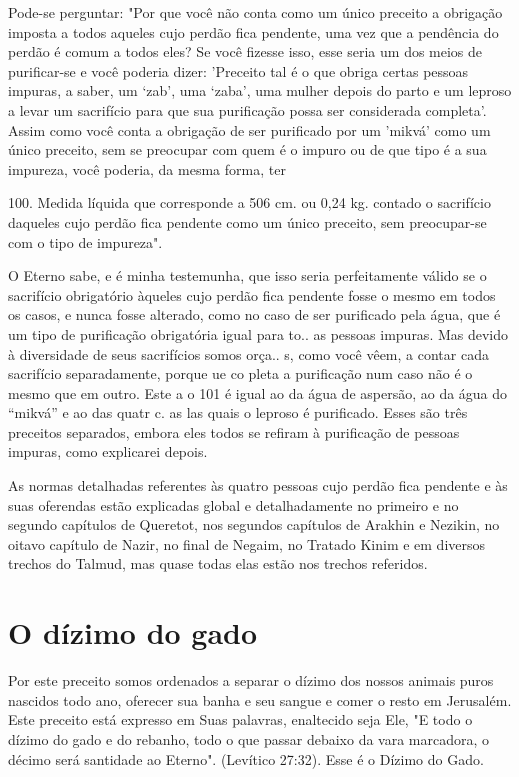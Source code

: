 Pode-se perguntar: "Por que você não conta como um único pre­ceito a
obrigação imposta a todos aqueles cujo perdão fica pendente, uma vez que
a pendência do perdão é comum a todos eles? Se você fizesse isso, esse
seria um dos meios de purificar-se e você poderia dizer: 'Preceito tal é
o que obriga certas pessoas impuras, a saber, um `zab', uma `zaba', uma
mulher de­pois do parto e um leproso a levar um sacrifício para que sua
purificação possa ser considerada completa'. Assim como você conta a
obrigação de ser purifica­do por um 'mikvá' como um único preceito, sem
se preocupar com quem é o impuro ou de que tipo é a sua impureza, você
poderia, da mesma forma, ter

100. Medida líquida que corresponde a 506 cm. ou 0,24
kg.
contado o sacrifício daqueles cujo perdão fica pendente como um único
pre­ceito, sem preocupar-se com o tipo de impureza".

O Eterno sabe, e é minha testemunha, que isso seria perfeitamente válido
se o sacrifício obrigatório àqueles cujo perdão fica pendente fosse o
mes­mo em todos os casos, e nunca fosse alterado, como no caso de ser
purificado pela água, que é um tipo de purificação obrigatória igual
para to.. as pessoas impuras. Mas devido à diversidade de seus
sacrifícios somos orça.. s, como você vêem, a contar cada sacrifício
separadamente, porque ue co pleta a purificação num caso não é o mesmo
que em outro. Este a o 101 é igual ao da água de aspersão, ao da água do
``mikvá'' e ao das quatr c. as las quais o leproso é purificado. Esses são
três preceitos separados, embora eles todos se refiram à purificação de
pessoas impuras, como explicarei depois.

As normas detalhadas referentes às quatro pessoas cujo perdão fica
pendente e às suas oferendas estão explicadas global e detalhadamente no
pri­meiro e no segundo capítulos de Queretot, nos segundos capítulos de
Arakhin e Nezikin, no oitavo capítulo de Nazir, no final de Negaim, no
Tratado Kinim e em diversos trechos do Talmud, mas quase todas elas
estão nos trechos referidos.

\section{O dízimo do gado}

Por este preceito somos ordenados a separar o dízimo dos nossos animais
puros nascidos todo ano, oferecer sua banha e seu sangue e comer o resto
em Jerusalém. Este preceito está expresso em Suas palavras, enaltecido
seja Ele, "E todo o dízimo do gado e do rebanho, todo o que passar
debaixo da vara marcadora, o décimo será santidade ao Eterno". (Levítico
27:32). Esse é o Dízimo do Gado.


